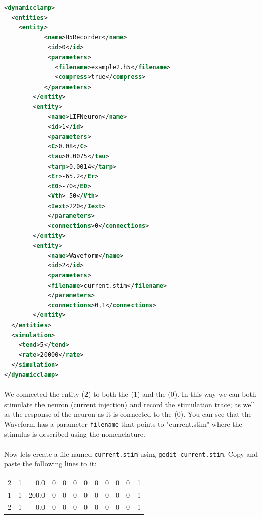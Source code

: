 \begin{lstlisting}[caption={Example of a configuration file with a the \nameref{entities:waveform} entity.},label={gettingStarted:example2}, language=XML,morekeywords={dynamic clamp,entities,entity,name,id,filename,compress,C,tau,tarp,Er,E0,Vth,Iext,parameters,connections,simulation,tend,rate}]
<dynamicclamp>
  <entities>
  	<entity>
 	       <name>H5Recorder</name>
        	<id>0</id>
        	<parameters>
		      <filename>example2.h5</filename>
		      <compress>true</compress>
	       </parameters>
    	</entity>
    	<entity>
      		<name>LIFNeuron</name>
      		<id>1</id>
      		<parameters>
			<C>0.08</C>
			<tau>0.0075</tau>
			<tarp>0.0014</tarp>
			<Er>-65.2</Er>
			<E0>-70</E0>
			<Vth>-50</Vth>
			<Iext>220</Iext>
      		</parameters>
      		<connections>0</connections>
    	</entity>
    	<entity>
      		<name>Waveform</name>
      		<id>2</id>
      		<parameters>
			<filename>current.stim</filename>
      		</parameters>
      		<connections>0,1</connections>
    	</entity>	
  </entities>
  <simulation>
  	<tend>5</tend>
   	<rate>20000</rate>
  </simulation>
</dynamicclamp>

\end{lstlisting}

\paragraph{}
We connected the  entity (2) to both the
 (1) and the 
(0). In this way we can both stimulate the neuron (current injection)
and record the stimulation trace; as well as the response of the
neuron as it is connected to the  (0).
You can see that the Waveform has a parameter \texttt{filename} that
points to  "current.stim" where the stimulus is described using the
 nomenclature.

\paragraph{}
Now lets create a file named \texttt{current.stim} using \texttt{gedit
  current.stim}. Copy and paste the following lines to it:
\begin{center}
\ttfamily
\begin{tabular}{rrrrrrrrrrrr}
2 & 1 & 0.0 & 0 & 0 & 0 & 0 & 0 & 0 & 0 &0 & 1 \\
1 & 1 & 200.0 & 0 & 0 & 0 & 0 & 0 & 0 & 0 & 0 & 1 \\
2 & 1 & 0.0 & 0 & 0 & 0 & 0 & 0 & 0 & 0 & 0 & 1 \\
\end{tabular}
\end{center}

